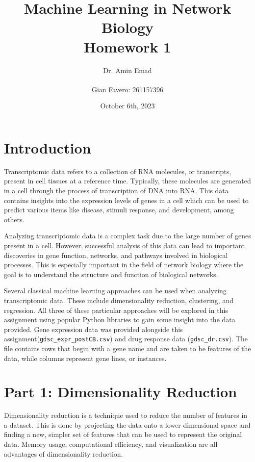 \documentclass[12pt]{article}
\begin{document}
\title{Machine Learning in Network Biology\\Homework 1}
\author{
        Dr. Amin Emad \\ \\
        Gian Favero: 261157396 \\
}
\date{October 6th, 2023}
\maketitle
\newpage

\tableofcontents
\newpage

\section{Introduction}
Transcriptomic data refers to a collection of RNA molecules, or transcripts, present in cell tissues at a reference time. Typically, these molecules are generated in a cell through the process of transcription of DNA into RNA. This data contains insights into the expression levels of genes in a cell which can be used to predict various items like disease, stimuli response, and development, among others.

Analyzing transcriptomic data is a complex task due to the large number of genes present in a cell. However, successful analysis of this data can lead to important discoveries in gene function, networks, and pathways involved in biological processes. This is especially important in the field of network biology where the goal is to understand the structure and function of biological networks.

Several classical machine learning approaches can be used when analyzing transcriptomic data. These include dimensionality reduction, clustering, and regression. All three of these particular approaches will be explored in this assignment using popular Python libraries to gain some insight into the data provided. Gene expression data was provided alongside this assignment(\verb|gdsc_expr_postCB.csv|) and drug response data (\verb|gdsc_dr.csv|). The file contains rows that begin with a gene name and are taken to be features of the data, while columns represent gene lines, or instances. 

\section{Part 1: Dimensionality Reduction}
Dimensionality reduction is a technique used to reduce the number of features in a dataset. This is done by projecting the data onto a lower dimensional space and finding a new, simpler set of features that can be used to represent the original data. Memory usage, computational efficiency, and visualization are all advantages of dimensionality reduction.
\end{document}

